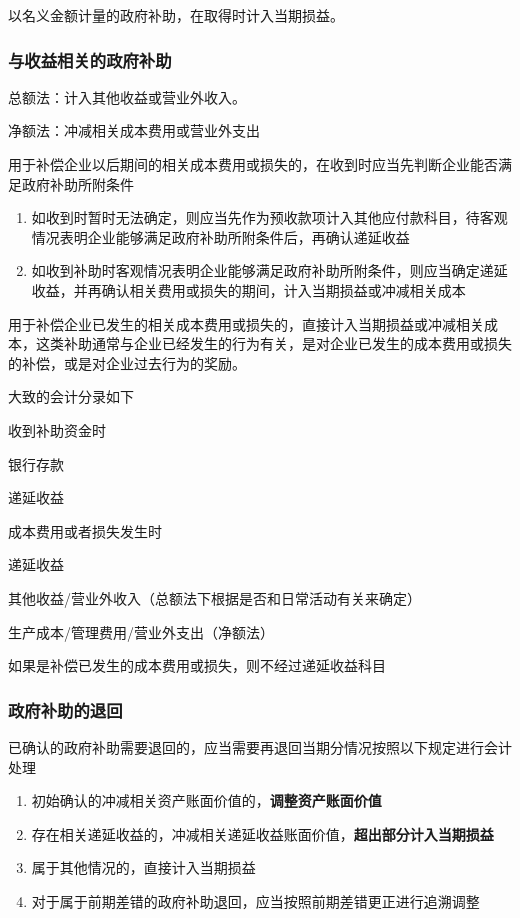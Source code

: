 \documentclass[UTF8,12pt]{ctexart}
\newenvironment{Dr}{%
	\begin{list}{}%
		{
			\setlength{\leftmargin}{2em}
			\setlength{\labelwidth}{2em}
			\setlength{\labelsep}{0pt}
			\setlength{\itemindent}{0pt}
			\setlength{\listparindent}{0pt}
			\setlength{\parsep}{0pt}
			\setlength{\topsep}{0pt}
		}
		\item[\textbf{借：}]
	}{%
	\end{list}
}
\newenvironment{Cr}{%
	\begin{list}{}%
		{
			\setlength{\leftmargin}{3em}
			\setlength{\labelwidth}{2em}
			\setlength{\labelsep}{0pt}
			\setlength{\itemindent}{0pt}
			\setlength{\listparindent}{0pt}
			\setlength{\parsep}{0pt}
			\setlength{\topsep}{0pt}
		}
		\item[\textbf{贷：}]
	}{%
	\end{list}
}
\numberwithin{equation}{section} %
\numberwithin{figure}{section}
\numberwithin{table}{section}
\begin{document}
	
	以名义金额计量的政府补助，在取得时计入当期损益。
	
	\subsubsection{与收益相关的政府补助}
	总额法：计入其他收益或营业外收入。
	
	净额法：冲减相关成本费用或营业外支出
	
	用于补偿企业以后期间的相关成本费用或损失的，在收到时应当先判断企业能否满足政府补助所附条件
	\begin{enumerate}
		\item 如收到时暂时无法确定，则应当先作为预收款项计入其他应付款科目，待客观情况表明企业能够满足政府补助所附条件后，再确认递延收益
		
		\item 如收到补助时客观情况表明企业能够满足政府补助所附条件，则应当确定递延收益，并再确认相关费用或损失的期间，计入当期损益或冲减相关成本
		
	\end{enumerate}
	
	用于补偿企业已发生的相关成本费用或损失的，直接计入当期损益或冲减相关成本，这类补助通常与企业已经发生的行为有关，是对企业已发生的成本费用或损失的补偿，或是对企业过去行为的奖励。
	
	大致的会计分录如下
	
	收到补助资金时
	\begin{Dr}
		银行存款
	\end{Dr}
	\begin{Cr}
		递延收益
	\end{Cr}
	
	成本费用或者损失发生时
	\begin{Dr}
		递延收益
	\end{Dr}
	\begin{Cr}
		其他收益/营业外收入（总额法下根据是否和日常活动有关来确定）
		
		生产成本/管理费用/营业外支出（净额法）
	\end{Cr}
	
	如果是补偿已发生的成本费用或损失，则不经过递延收益科目
	
	\subsubsection{政府补助的退回}
	已确认的政府补助需要退回的，应当需要再退回当期分情况按照以下规定进行会计处理
	\begin{enumerate}
		\item 初始确认的冲减相关资产账面价值的，\textbf{调整资产账面价值}
		
		\item 存在相关递延收益的，冲减相关递延收益账面价值，\textbf{超出部分计入当期损益}
		
		\item 属于其他情况的，直接计入当期损益
		
		\item 对于属于前期差错的政府补助退回，应当按照前期差错更正进行追溯调整
	\end{enumerate}
	
\end{document}
